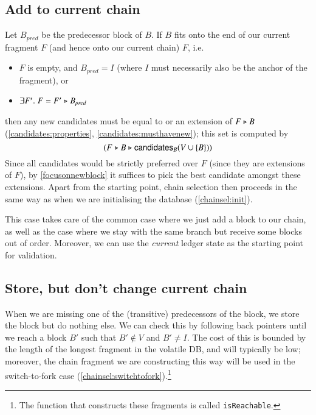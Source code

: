 \subsection{Add to current chain}
\label{chainsel:addtochain}

Let $B_\mathit{pred}$ be the predecessor block of $B$. If $B$ fits onto the end
of our current fragment $F$ (and hence onto our current chain) $F$, i.e.
%
\begin{itemize}
\item $F$ is empty, and $B_\mathit{pred} = I$
(where $I$ must necessarily also be the anchor of the fragment), or
\item $\exists F' .\; F = F' \mathrel{\triangleright} B_\mathit{pred}$
\end{itemize}
%
then any new candidates must be equal to or an extension of $F \mathrel{\triangleright} B$
(\cref{candidates:properties}, \cref{candidates:musthavenew}); this set is
computed by
%
\begin{equation*}
(F \mathrel{\triangleright} B \mathrel{\triangleright} \mathsf{candidates}_B(V \cup \{B\}))
\end{equation*}
%
Since all candidates would be strictly preferred over $F$ (since they are
extensions of $F$), by \cref{focusonnewblock} it suffices to pick the best
candidate amongst these extensions. Apart from the starting point, chain
selection then proceeds in the same way as when we are initialising the database
(\cref{chainsel:init}).

This case takes care of the common case where we just add a block to our chain,
as well as the case where we stay with the same branch but receive some blocks
out of order. Moreover, we can use the \emph{current} ledger state as the
starting point for validation.

\subsection{Store, but don't change current chain}

When we are missing one of the (transitive) predecessors of the block, we store
the block but do nothing else. We can check this by following back pointers
until we reach a block $B'$ such that $B' \notin V$ and $B' \neq I$. The cost of
this is bounded by the length of the longest fragment in the volatile DB, and
will typically be low; moreover, the chain fragment we are constructing this way
will be used in the switch-to-fork case
(\cref{chainsel:switchtofork}).\footnote{The function that constructs these
fragments is called \lstinline!isReachable!.}

